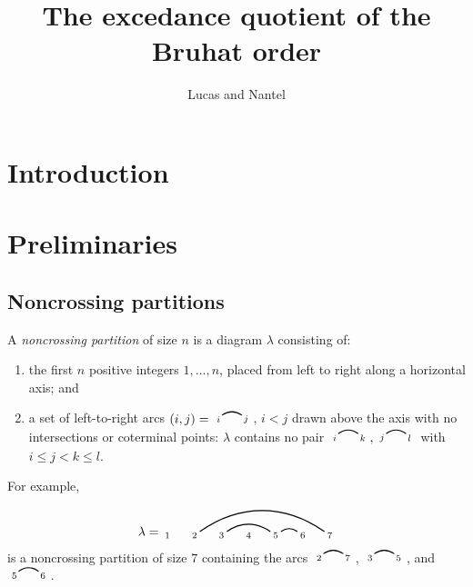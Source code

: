 \documentclass[12pt]{article}
\theoremstyle{definition}
\theoremstyle{remark}
\numberwithin{equation}{section}
\newcommand{\edge}[2]{\tikz[scale = 0.75, baseline = -0.2cm]{
\draw (0.1, 0) node[inner sep = 0ex] (a) {};
\node[left, xshift = 0.1cm, yshift = -0.1cm] at (a) {$\scriptstyle #1$};
\draw (0.9, 0)  node[inner sep = 0ex] (b) {};
\node[right, xshift = -0.1cm, yshift = -0.1cm] at (b) {$\scriptstyle #2$};
\draw[thick] (a) to[out = 35, in = 145] (b);}}
\begin{document}
\title{The excedance quotient of the Bruhat order}
\author{Lucas and Nantel}
\maketitle

\section{Introduction}

\section{Preliminaries}

\subsection{Noncrossing partitions}
\label{sec:ncp}


A \emph{noncrossing partition} of size $n$ is a diagram $\lambda$ consisting of:
\begin{enumerate}
\item the first $n$ positive integers $1, \ldots, n$, placed from left to right along a horizontal axis; and

\item a set of left-to-right arcs $ (i, j) = \edge{i}{j}$, $i < j$ drawn above the axis with no intersections or coterminal points: $\lambda$ contains no pair $\edge{i}{k}, \edge{j}{l}$ with $i \le j < k \le l$.

\end{enumerate}
For example,
\begin{equation}
\label{eq:noncrossingpartitionexample}
\lambda = \begin{tikzpicture}[scale = 0.75, baseline = 0.75*-0.2]
\foreach \x in {1, ..., 7}{\draw[fill] (\x - 1, 0) node[inner sep = 2pt] (\x) {$\scriptstyle \x$};}
\foreach \i\j in {5/6, 3/5,2/7}{\draw[thick] (\i) to[out = 35, in = 145] (\j);}
\end{tikzpicture}
\end{equation}
is a noncrossing partition of size $7$ containing the arcs $\edge{2}{7}$, $\edge{3}{5}$, and $\edge{5}{6}$.
\end{document}
